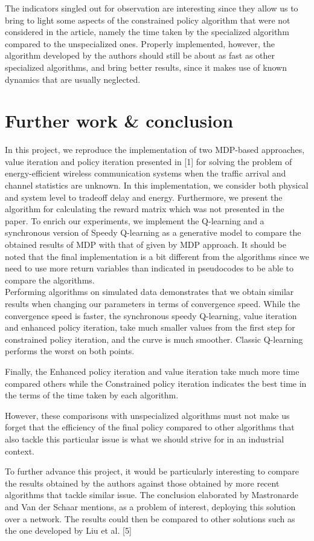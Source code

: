 \documentclass[a4paper, 12pt]{report}
\begin{document}
The indicators singled out for observation are interesting since they allow us to bring to light some aspects of the constrained policy algorithm that were not considered in the article, namely the time taken by the specialized algorithm compared to the unspecialized ones.
Properly implemented, however, the algorithm developed by the authors should still be about as fast as other specialized algorithms,
and bring better results, since it makes use of known dynamics that are usually neglected.

\chapter*{Further work \& conclusion}

In this project, we reproduce the implementation of two MDP-based approaches, value iteration and policy iteration presented in [1] for solving the problem of energy-efficient wireless communication systems when the traffic arrival and channel statistics are unknown. In this implementation, we consider both physical and system level to tradeoff delay and energy. Furthermore, we present the algorithm for calculating the reward matrix which was not presented in the paper. To enrich our
experiments, we implement the Q-learning and a synchronous version of Speedy Q-learning as a generative model to compare the obtained results of MDP with that of given by MDP approach. It should be noted that the final implementation is a bit different from
the algorithms since we need to use more return variables than indicated in pseudocodes to be able to compare the algorithms.\\

Performing algorithms on simulated data demonstrates that  we obtain similar results when changing our parameters in terms of convergence speed. While the convergence speed is faster, the synchronous speedy Q-learning, value iteration and enhanced policy iteration, take much smaller values from the first step for constrained policy iteration, and the curve is much smoother. Classic Q-learning performs the worst on both points.  

Finally, the Enhanced policy iteration and value iteration take much more time compared others while the Constrained policy iteration indicates the best time in the terms of the time taken by each algorithm.

However, these comparisons with unspecialized algorithms must not make us forget that the efficiency of the final policy compared to other algorithms that also tackle this particular issue is what we should strive for in an industrial context.

To further advance this project, it would be particularly interesting to compare the results obtained by the authors against those obtained by more recent algorithms that tackle similar issue.
The conclusion elaborated by Mastronarde and Van der Schaar mentions, as a problem of interest, deploying this solution over a network.
The results could then be compared to other solutions such as the one developed by Liu et al. [5]






\end{document}
